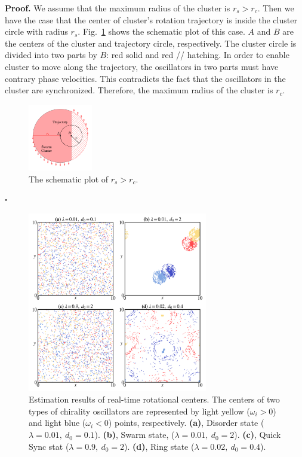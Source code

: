 \documentclass[%
 aip,
 amsmath,amssymb,
 reprint,%
]{revtex4-1}
\newenvironment{proof}{\noindent\textbf{Proof.}}{\hfill $\square$\par}
\begin{document}
\begin{proof}
    We assume that the maximum radius of the cluster is $r_s>r_c$. Then we have the case that the center of cluster's rotation trajectory is inside the cluster circle with radius $r_s$. 
    Fig.~\ref{fig:rsProofEps} shows the schematic plot of this case. $A$ and $B$ 
    are the centers of the cluster and trajectory circle, respectively. The cluster circle is divided into two parts by $B$: red solid and red // hatching. In order to enable cluster to move along the trajectory, the oscillators in two parts must have contrary phase velocities. This contradicts the fact that the oscillators in the cluster are synchronized. Therefore, the maximum radius of the cluster is $r_c$.

    \begin{figure}
        \includegraphics[width=0.25\textwidth]{./figs/rsProofEps.pdf}
        \caption{
            \label{fig:rsProofEps} The schematic plot of $r_s>r_c$.
        }
    \end{figure}

\end{proof}

\begin{figure}
    \includegraphics[width=0.7\textwidth]{./figs/etimateCenter.png}
    \caption{
        \label{fig:etimateCenter} Estimation results of real-time rotational centers. 
        The centers of two types of chirality oscillators are represented by light yellow ($\omega_i > 0$) and light blue
        ($\omega_i < 0$) points, respectively.
        \textbf{(a)}, Disorder state ($\lambda=0.01,\ d_0=0.1$).
        \textbf{(b)}, Swarm state, ($\lambda=0.01,\ d_0=2$).
        \textbf{(c)}, Quick Sync stat ($\lambda=0.9,\ d_0=2$).
        \textbf{(d)}, Ring state ($\lambda=0.02,\ d_0=0.4$).
    }
\end{figure}

\nocite{*}

\end{document}
